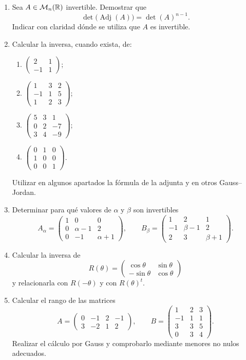 \begin{enumerate}[label=\textbf{\arabic*.},leftmargin=*]
\item Sea $A\in\mathcal M_n(\mathbb{R})$ invertible. Demostrar que
\[
\det\bigl(\operatorname{Adj}(A)\bigr)=\det(A)^{n-1}.
\]
Indicar con claridad dónde se utiliza que $A$ es invertible.

\item Calcular la inversa, cuando exista, de:
\begin{enumerate}[label=\alph*)]
\item $\begin{pmatrix}2&1\\-1&1\end{pmatrix}$;
\item $\begin{pmatrix}1&3&2\\-1&1&5\\1&2&3\end{pmatrix}$;
\item $\begin{pmatrix}5&3&1\\0&2&-7\\3&4&-9\end{pmatrix}$;
\item $\begin{pmatrix}0&1&0\\1&0&0\\0&0&1\end{pmatrix}$.
\end{enumerate}
Utilizar en algunos apartados la fórmula de la adjunta y en otros Gauss--Jordan.

\item Determinar para qué valores de $\alpha$ y $\beta$ son invertibles
\[
A_\alpha=
\begin{pmatrix}
1&0&0\\
0&\alpha-1&2\\
0&-1&\alpha+1
\end{pmatrix},
\qquad
B_\beta=
\begin{pmatrix}
1&2&1\\
-1&\beta-1&2\\
2&3&\beta+1
\end{pmatrix}.
\]

\item Calcular la inversa de
\[
R(\theta)=
\begin{pmatrix}
\cos\theta&\sin\theta\\
-\sin\theta&\cos\theta
\end{pmatrix}
\]
y relacionarla con $R(-\theta)$ y con $R(\theta)^t$.

\item Calcular el rango de las matrices
\[
A=\begin{pmatrix}
0&-1&2&-1\\
3&-2&1&2
\end{pmatrix},
\qquad
B=\begin{pmatrix}
1&2&3\\
-1&1&1\\
3&3&5\\
0&3&4
\end{pmatrix}.
\]
Realizar el cálculo por Gauss y comprobarlo mediante menores no nulos adecuados.


\end{enumerate}
